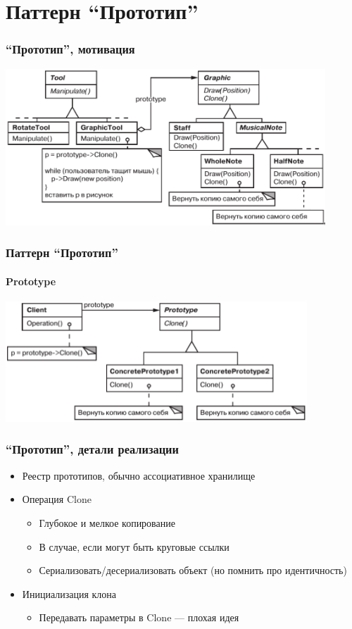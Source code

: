 \documentclass{../../slides-style}
\begin{document}
    \section{Паттерн ``Прототип''}

    \begin{frame}
        \frametitle{``Прототип'', мотивация}
        \begin{center}
            \includegraphics[width=0.9\textwidth]{musicalEditor.png}
        \end{center}
    \end{frame}

    \begin{frame}
        \frametitle{Паттерн ``Прототип''}
        \framesubtitle{Prototype}
        \begin{center}
            \includegraphics[width=0.85\textwidth]{prototype.png}
        \end{center}
    \end{frame}
    
    \begin{frame}
        \frametitle{``Прототип'', детали реализации}
        \begin{itemize}
            \item Реестр прототипов, обычно ассоциативное хранилище
            \item Операция Clone
            \begin{itemize}
                \item Глубокое и мелкое копирование
                \item В случае, если могут быть круговые ссылки
                \item Сериализовать/десериализовать объект (но помнить про идентичность)
            \end{itemize}
            \item Инициализация клона
            \begin{itemize}
                \item Передавать параметры в Clone --- плохая идея
            \end{itemize}
        \end{itemize}
    \end{frame}
\end{document}
